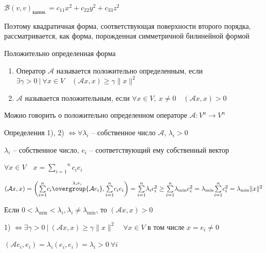\documentclass[12pt]{article}
\begin{document}
    $\mathcal{B}(v, v)_{\text{канон.}} = c_{11}x^2 + c_{22}y^2 + c_{33}z^2$

    Поэтому квадратичная форма, соответствующая поверхности второго порядка, рассматривается, как форма, порожденная симметричной билинейной формой

    \hypertarget{positivedefinedoperator}{}

    \Def Положительно определенная форма

    \begin{enumerate}[label*=\arabic*) ]
        \item Оператор $\mathcal{A}$ называется положительно определенным, если $\exists \gamma > 0 \ | \ \forall x \in V \quad (\mathcal{A}x, x) \geq \gamma \|x\|^2$

        \item $\mathcal{A}$ называется положительным, если
        $\forall x \in V, \ x \neq 0 \quad (\mathcal{A}x, x) > 0$
    \end{enumerate}

    \Nota Можно говорить о положительно определенном операторе $\mathcal{A}: V^n \rightarrow V^n$

    \begin{MyTheorem}
        \Ths Определения 1), 2) $\Longleftrightarrow \forall \lambda_i$ -- собственное число $\mathcal{A}$, $\lambda_i > 0$
    \end{MyTheorem}

    \begin{MyProof}
        \fbox{$\Longrightarrow$} $\lambda_i$ -- собственное число, $e_i$ -- соответствующий ему собственный вектор

        $\forall x \in V \quad x = \overset{n}{\underset{i = 1}{\sum}} c_i e_i$

        $(\mathcal{A}x, x) = \left(\overset{n}{\underset{i = 1}{\sum}} c_i \overset{\lambda_i e_i}{\overgroup{\mathcal{A}e_i}}, \overset{n}{\underset{i = 1}{\sum}} c_i e_i\right) =
        \overset{n}{\underset{i = 1}{\sum}} \lambda_i c_i^2 \geq \overset{n}{\underset{i = 1}{\sum}}\lambda_{\min} c_i^2 =
        \lambda_{\min} \overset{n}{\underset{i = 1}{\sum}}c_i^2 = \lambda_{\min} \|x\|^2$

        Если $0 < \lambda_{\min} < \lambda_i, \lambda_i \neq \lambda_{\min}$, то $(\mathcal{A}x, x) > 0$

        \fbox{$\Longleftarrow$} 1) $\Longleftrightarrow \exists \gamma > 0 \ | \ (\mathcal{A}x, x) \geq \gamma \|x\|^2 \quad \forall x \in V$ в том числе $x = e_i \neq 0$

        $(\mathcal{A}e_i, e_i) = \lambda_i (e_i, e_i) = \lambda_i > 0 \ \forall i$

    \end{MyProof}
\end{document}

